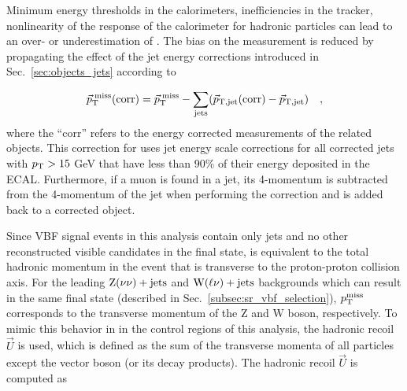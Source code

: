 Minimum energy thresholds in the calorimeters, inefficiencies
in the tracker, nonlinearity of the response of the calorimeter
for hadronic particles can lead to an over- or underestimation of \ptmiss.
The bias on the \ptmiss measurement is reduced by propagating the effect of the jet energy
corrections introduced in Sec.~\ref{sec:objects_jets} according to

\begin{equation}
\vec{p}_{\textrm{T}}^{\;\textrm{miss}}(\mathrm{corr})
=\vec{p}_{\textrm{T}}^{\;\textrm{miss}} - \sum_\mathrm{jets} (\vec{p}_\mathrm{T,jet}({\mathrm{corr}})-\vec{p}_\mathrm{T,jet}) \quad ,
\label{eq:Type1MET}
\end{equation}
where the ``corr'' refers to the energy corrected measurements
of the related objects.
This correction for \ptvecmiss uses jet energy scale corrections
for all corrected jets with $p_{\textrm{T}} > 15$ GeV that have less than $90 \%$
of their energy deposited in the ECAL. Furthermore, if a muon is found in a
jet, its 4-momentum is subtracted from the 4-momentum of the jet
when performing the correction and is added back to a corrected object.

Since VBF \hinv signal events in this analysis contain only jets and no other 
reconstructed visible candidates in the final state,
\ptmiss is equivalent to the total hadronic momentum in the event that is transverse to the proton-proton collision axis. 
For the leading $\textrm{Z}(\nu\nu)+\textrm{jets}$ and $\textrm{W}(\ell\nu)+\textrm{jets}$ backgrounds which can result in the same final state 
(described in Sec.~\ref{subsec:sr_vbf_selection}), 
$p_{\textrm{T}}^{\textrm{miss}}$ corresponds to the transverse momentum of the $\textrm{Z}$ and $\textrm{W}$ boson, respectively. 
To mimic this behavior in in the control regions of this analysis, the hadronic recoil
$\vec{U}$ is used, which is defined as the sum of the transverse
momenta of all particles except the vector boson (or its decay products).
The hadronic recoil $\vec{U}$ is computed as

